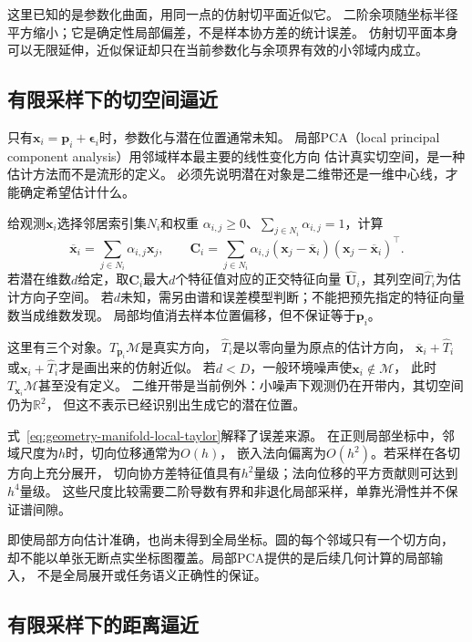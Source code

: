 这里已知的是参数化曲面，用同一点的仿射切平面近似它。
二阶余项随坐标半径平方缩小；它是确定性局部偏差，不是样本协方差的统计误差。
仿射切平面本身可以无限延伸，近似保证却只在当前参数化与余项界有效的小邻域内成立。

\subsection{有限采样下的切空间逼近}
\label{sec:geometry-sampled-local-linearization}

只有$\bm x_i=\bm p_i+\bm\epsilon_i$时，参数化与潜在位置通常未知。
局部PCA（local principal component analysis）用邻域样本最主要的线性变化方向
估计真实切空间，是一种估计方法而不是流形的定义。
必须先说明潜在对象是二维带还是一维中心线，才能确定希望估计什么。

给观测$\bm x_i$选择邻居索引集$N_i$和权重
$\alpha_{i,j}\geq0$、$\sum_{j\in N_i}\alpha_{i,j}=1$，计算
\begin{equation}
 \overline{\bm x}_i=\sum_{j\in N_i}\alpha_{i,j}\bm x_j,\qquad
 \bm C_i=\sum_{j\in N_i}\alpha_{i,j}
  (\bm x_j-\overline{\bm x}_i)(\bm x_j-\overline{\bm x}_i)^\top.
 \label{eq:geometry-local-weighted-covariance}
\end{equation}
若潜在维数$d$给定，取$\bm C_i$最大$d$个特征值对应的正交特征向量
$\widehat{\bm U}_i$，其列空间$\widehat T_i$为估计方向子空间。
若$d$未知，需另由谱和误差模型判断；不能把预先指定的特征向量数当成维数发现。
局部均值消去样本位置偏移，但不保证等于$\bm p_i$。

这里有三个对象。$T_{\bm p_i}\mathcal M$是真实方向，
$\widehat T_i$是以零向量为原点的估计方向，
$\overline{\bm x}_i+\widehat T_i$或$\bm x_i+\widehat T_i$才是画出来的仿射近似。
若$d<D$，一般环境噪声使$\bm x_i\notin\mathcal M$，
此时$T_{\bm x_i}\mathcal M$甚至没有定义。
二维开带是当前例外：小噪声下观测仍在开带内，其切空间仍为$\mathbb R^2$，
但这不表示已经识别出生成它的潜在位置。

式~\eqref{eq:geometry-manifold-local-taylor}解释了误差来源。
在正则局部坐标中，邻域尺度为$h$时，切向位移通常为$O(h)$，
嵌入法向偏离为$O(h^2)$。若采样在各切方向上充分展开，
切向协方差特征值具有$h^2$量级；法向位移的平方贡献则可达到$h^4$量级。
这些尺度比较需要二阶导数有界和非退化局部采样，单靠光滑性并不保证谱间隙。


即使局部方向估计准确，也尚未得到全局坐标。圆的每个邻域只有一个切方向，
却不能以单张无断点实坐标图覆盖。局部PCA提供的是后续几何计算的局部输入，
不是全局展开或任务语义正确性的保证。

\subsection{有限采样下的距离逼近}
\label{sec:geometry-sampled-geodesic-distance}

